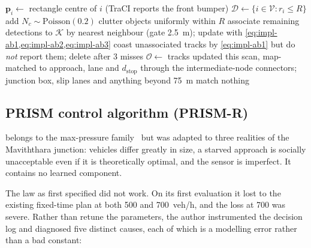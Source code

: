 \begin{algorithm}[htbp]
\DontPrintSemicolon
{}
$\mathbf{p}_i \gets$ rectangle centre of $i$ (TraCI reports the front bumper)\;
$\mathcal{D} \gets \{ i \in \mathcal{V} : r_i \leq R \}$\;
add $N_c \sim \text{Poisson}(0.2)$ clutter objects uniformly within $R$\;
associate remaining detections to $\mathcal{K}$ by nearest neighbour (gate 2.5~m); update with \cref{eq:impl-ab1,eq:impl-ab2,eq:impl-ab3}\;
coast unassociated tracks by \cref{eq:impl-ab1} but do \emph{not} report them; delete after 3 misses\;
$\mathcal{O} \gets$ tracks updated this scan, map-matched to approach, lane and $d_{\text{stop}}$ through the intermediate-node connectors; junction box, slip lanes and anything beyond 75~m match nothing\;
\caption{\vls{} scan and perception}\label{alg:vls}
\end{algorithm}

\subsection{PRISM control algorithm (PRISM-R)}\label{sec:impl-prism}

\prism{} belongs to the max-pressure family~\cite{varaiya2013maxpressure,tassiulas1992} but was adapted
to three realities of the Maviththara junction: vehicles differ greatly in size, a starved approach is
socially unacceptable even if it is theoretically optimal, and the sensor is imperfect.  It contains no learned component.

The law as first specified did not work. On its first evaluation it lost to the existing fixed-time plan at
both 500 and 700~veh/h, and the loss at 700 was severe. Rather than retune the parameters, the author
instrumented the decision log and diagnosed five distinct causes, each of which is a modelling error rather
than a bad constant:


